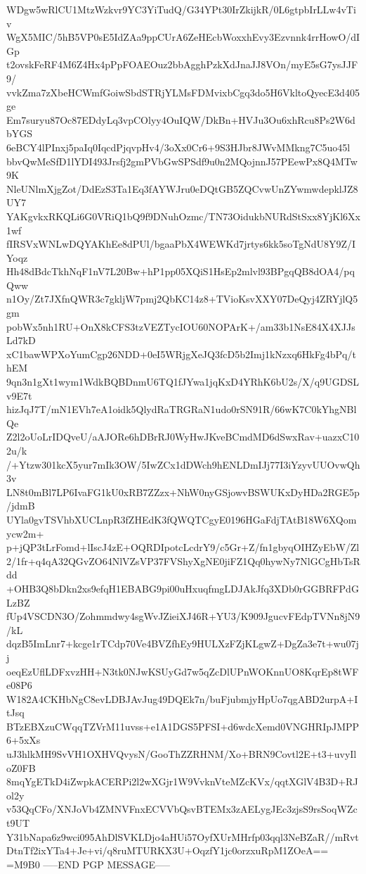 WDgw5wRlCU1MtzWzkvr9YC3YiTudQ/G34YPt30IrZkijkR/0L6gtpbIrLLw4vTiv
WgX5MIC/5hB5VP0sE5IdZAa9ppCUrA6ZeHEcbWoxxhEvy3Ezvnnk4rrHowO/dIGp
t2ovskFeRF4M6Z4Hx4pPpFOAEOuz2bbAgghPzkXdJnaJJ8VOn/myE5sG7ysJJF9/
vvkZma7zXbeHCWmfGoiwSbdSTRjYLMsFDMvixbCgq3do5H6VkltoQyecE3d405ge
Em7suryu87Oc87EDdyLq3vpCOlyy4OuIQW/DkBn+HVJu3Ou6xhRcu8Ps2W6dbYGS
6eBCY4lPInxj5paIq0IqcdPjqvpHv4/3oXx0Cr6+9S3HJbr8JWvMMkng7C5uo45l
bbvQwMeSfD1lYDI493Jrsfj2gmPVbGwSPSdf9u0n2MQojnnJ57PEewPx8Q4MTw9K
NleUNlmXjgZot/DdEzS3Ta1Eq3fAYWJru0eDQtGB5ZQCvwUnZYwmwdepklJZ8UY7
YAKgvkxRKQLi6G0VRiQ1bQ9f9DNuhOzmc/TN73OidukbNURdStSxx8YjKl6Xx1wf
fIRSVxWNLwDQYAKhEe8dPUl/bgaaPbX4WEWKd7jrtys6kk5soTgNdU8Y9Z/IYoqz
Hh48dBdcTkhNqF1nV7L20Bw+hP1pp05XQiS1HsEp2mlvl93BPgqQB8dOA4/pqQww
n1Oy/Zt7JXfnQWR3c7gkljW7pmj2QbKC14z8+TVioKsvXXY07DeQyj4ZRYjlQ5gm
pobWx5nh1RU+OnX8kCFS3tzVEZTycIOU60NOPArK+/am33b1NsE84X4XJJsLd7kD
xC1bawWPXoYumCgp26NDD+0eI5WRjgXeJQ3fcD5b2Imj1kNzxq6HkFg4bPq/thEM
9qn3n1gXt1wym1WdkBQBDnmU6TQ1fJYwa1jqKxD4YRhK6bU2s/X/q9UGDSLv9E7t
hizJqJ7T/mN1EVh7eA1oidk5QlydRaTRGRaN1udo0rSN91R/66wK7C0kYhgNBlQe
Z2l2oUoLrIDQveU/aAJORe6hDBrRJ0WyHwJKveBCmdMD6dSwxRav+uazxC102u/k
/+Ytzw301kcX5yur7mIk3OW/5IwZCx1dDWch9hENLDmIJj77I3iYzyvUUOvwQh3v
LN8t0mBl7LP6IvaFG1kU0xRB7ZZzx+NhW0nyGSjowvBSWUKxDyHDa2RGE5p/jdmB
UYla0gvTSVhbXUCLnpR3fZHEdK3fQWQTCgyE0196HGaFdjTAtB18W6XQomycw2m+
p+jQP3tLrFomd+lIscJ4zE+OQRDIpotcLcdrY9/c5Gr+Z/fn1gbyqOIHZyEbW/Zl
2/1fr+q4qA32QGvZO64NlVZsVP37FVShyXgNE0jiFZ1Qq0hywNy7NlGCgHbTsRdd
+OHB3Q8bDkn2xs9efqH1EBABG9pi00uHxuqfmgLDJAkJfq3XDb0rGGBRFPdGLzBZ
fUp4VSCDN3O/Zohmmdwy4sgWvJZieiXJ46R+YU3/K909JgucvFEdpTVNn8jN9/kL
dqzB5ImLnr7+kcge1rTCdp70Ve4BVZfhEy9HULXzFZjKLgwZ+DgZa3e7t+wu07jj
oeqEzUflLDFxvzHH+N3tk0NJwKSUyGd7w5qZcDlUPnWOKnnUO8KqrEp8tWFe08P6
W182A4CKHbNgC8evLDBJAvJug49DQEk7n/buFjubmjyHpUo7qgABD2urpA+ItJsq
BTzEBXzuCWqqTZVrM11uvss+e1A1DGS5PFSI+d6wdcXemd0VNGHRIpJMPP6+5xXs
uJ3hlkMH9SvVH1OXHVQvysN/GooThZZRHNM/Xo+BRN9Covtl2E+t3+uvyIloZ0FB
8mqYgETkD4iZwpkACERPi2l2wXGjr1W9VvknVteMZcKVx/qqtXGlV4B3D+RJol2y
v53QqCFo/XNJoVb4ZMNVFnxECVVbQsvBTEMx3zAELygJEc3zjsS9rsSoqWZct9UT
Y31bNapa6z9wci095AhDlSVKLDjo4aHUi57OyfXUrMHrfp03qql3NeBZaR//mRvt
DtnTf2ixYTa4+Je+vi/q8ruMTURKX3U+OqzfY1jc0orzxuRpM1ZOeA==
=M9B0
-----END PGP MESSAGE-----
